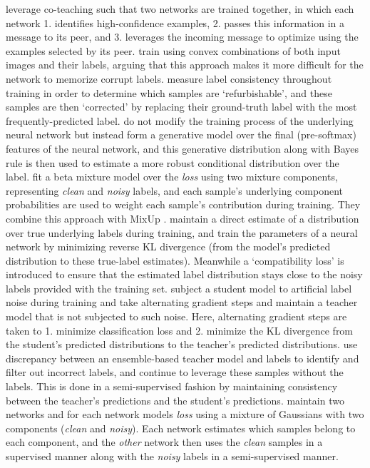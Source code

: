 \documentclass{article}
\renewcommand{\b}[1]{\textbf{#1}}
\begin{document}
\b{\cite{han2018}} leverage co-teaching such that two networks are trained together, in which each network 1. identifies high-confidence examples, 2. passes this information in a message to its peer, and 3. leverages the incoming message to optimize using the examples selected by its peer.
\b{\cite{zhang2018mixup}} train using convex combinations of both input images and their labels, arguing that this approach makes it more difficult for the network to memorize corrupt labels.
\b{\cite{song2019}} measure label consistency throughout training in order to determine which samples are `refurbishable', and these samples are then `corrected' by replacing their ground-truth label with the most frequently-predicted label.
\b{\cite{lee2019}} do not modify the training process of the underlying neural network but instead form a generative model over the final (pre-softmax) features of the neural network, and this generative distribution along with Bayes rule is then used to estimate a more robust conditional distribution over the label.
\b{\cite{arazo2019}} fit a beta mixture model over the \emph{loss} using two mixture components, representing \emph{clean} and \emph{noisy} labels, and each sample's underlying component probabilities are used to weight each sample's contribution during training. They combine this approach with MixUp \cite{zhang2018mixup}.
\b{\cite{yi2019}} maintain a direct estimate of a distribution over true underlying labels during training, and train the parameters of a neural network by minimizing reverse KL divergence (from the model's predicted distribution to these true-label estimates). Meanwhile a `compatibility loss' is introduced to ensure that the estimated label distribution stays close to the noisy labels provided with the training set.
\b{\cite{li2019}} subject a student model to artificial label noise during training and take alternating gradient steps and maintain a teacher model that is not subjected to such noise. Here, alternating gradient steps are taken to 1. minimize classification loss and 2. minimize the KL divergence from the student's predicted distributions to the teacher's predicted distributions.
\b{\cite{nguyen2020}} use discrepancy between an ensemble-based teacher model and labels to identify and filter out incorrect labels, and continue to leverage these samples without the labels. This is done in a semi-supervised fashion by maintaining consistency between the teacher's predictions and the student's predictions.
\b{\cite{li2020}} maintain two networks and for each network models \emph{loss} using a mixture of Gaussians with two components (\emph{clean} and \emph{noisy}). Each network estimates which samples belong to each component, and the \emph{other} network then uses the \emph{clean} samples in a supervised manner along with the \emph{noisy} labels in a semi-supervised manner.
\end{document}
